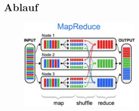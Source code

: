 \documentclass[a4paper,12pt]{article}
\begin{document}
\subsection{Ablauf}

\begin{figure}[h]
    \centering
    \includegraphics[width=6.1cm]{mapreduce.png}
    \cite{mrsystempic}
\end{figure}
\end{document}
